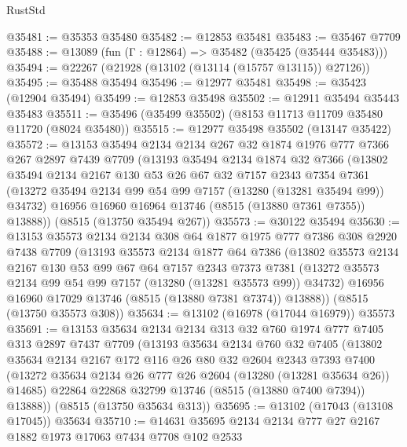 \begin{lexlean}{RustStd}
\begin{coremodule}
@35481 := @35353 @35480
@35482 := @12853 @35481
@35483 := @35467 @7709
@35488 := @13089 (fun (Γ : @12864) => @35482 (@35425 (@35444 @35483)))
@35494 := @22267 (@21928 (@13102 (@13114 (@15757 @13115)) @27126))
@35495 := @35488 @35494
@35496 := @12977 @35481
@35498 := @35423 (@12904 @35494)
@35499 := @12853 @35498
@35502 := @12911 @35494 @35443 @35483
@35511 := @35496 (@35499 @35502) (@8153 @11713 @11709 @35480 @11720 (@8024 @35480))
@35515 := @12977 @35498 @35502 (@13147 @35422)
@35572 := @13153
    @35494
    @2134
    @2134
    @267
    @32
    @1874
    @1976
    @777
    @7366
    @267
    @2897
    @7439
    @7709
    (@13193
      @35494
      @2134
      @1874
      @32
      @7366
      (@13802
        @35494
        @2134
        @2167
        @130
        @53
        @26
        @67
        @32
        @7157
        @2343
        @7354
        @7361
        (@13272 @35494 @2134 @99 @54 @99 @7157 (@13280 (@13281 @35494 @99)) @34732)
        @16956
        @16960
        @16964
        @13746
        (@8515 (@13880 @7361 @7355))
        @13888))
    (@8515 (@13750 @35494 @267))
@35573 := @30122 @35494
@35630 := @13153
    @35573
    @2134
    @2134
    @308
    @64
    @1877
    @1975
    @777
    @7386
    @308
    @2920
    @7438
    @7709
    (@13193
      @35573
      @2134
      @1877
      @64
      @7386
      (@13802
        @35573
        @2134
        @2167
        @130
        @53
        @99
        @67
        @64
        @7157
        @2343
        @7373
        @7381
        (@13272 @35573 @2134 @99 @54 @99 @7157 (@13280 (@13281 @35573 @99)) @34732)
        @16956
        @16960
        @17029
        @13746
        (@8515 (@13880 @7381 @7374))
        @13888))
    (@8515 (@13750 @35573 @308))
@35634 := @13102 (@16978 (@17044 @16979)) @35573
@35691 := @13153
    @35634
    @2134
    @2134
    @313
    @32
    @760
    @1974
    @777
    @7405
    @313
    @2897
    @7437
    @7709
    (@13193
      @35634
      @2134
      @760
      @32
      @7405
      (@13802
        @35634
        @2134
        @2167
        @172
        @116
        @26
        @80
        @32
        @2604
        @2343
        @7393
        @7400
        (@13272 @35634 @2134 @26 @777 @26 @2604 (@13280 (@13281 @35634 @26)) @14685)
        @22864
        @22868
        @32799
        @13746
        (@8515 (@13880 @7400 @7394))
        @13888))
    (@8515 (@13750 @35634 @313))
@35695 := @13102 (@17043 (@13108 @17045)) @35634
@35710 := @14631
    @35695
    @2134
    @2134
    @777
    @27
    @2167
    @1882
    @1973
    @17063
    @7434
    @7708
    @102
    @2533

\end{coremodule}
\end{lexlean}
